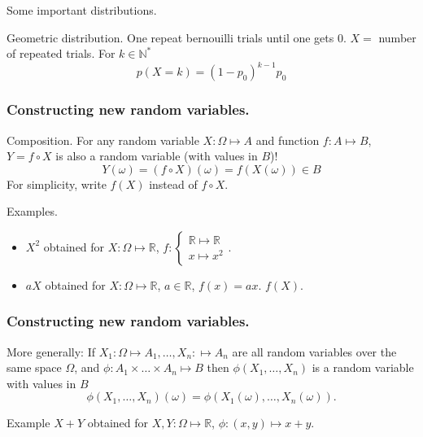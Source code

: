 \documentclass{beamer}
\begin{document}
\begin{frame}{Some important distributions.}
  \begin{exampleblock}{Geometric distribution.}
    One repeat bernouilli trials until one gets $0$. $X = $ number of repeated trials. For $k \in \mathbb{N}^*$
    \[p(X = k) = (1 - p_0)^{k-1}p_0\]
    
  \end{exampleblock}
\end{frame}

\begin{frame}
  \frametitle{Constructing new random variables.}
  \begin{block}{Composition.}
    For any random variable $X: \Omega \mapsto A$ and function $f: A \mapsto B$, $Y = f \circ X$ is also a random variable (with values in $B$)!
    \[Y(\omega) = (f \circ X) (\omega) = f(X(\omega)) \in B\]
    For simplicity, write $f(X)$ instead of $f \circ X$. 
  \end{block}
  \begin{exampleblock}{Examples.}
    \begin{itemize}
    \item $X^2$ obtained for $X: \Omega \mapsto \mathbb{R}$, $f: \left \{ \begin{array}{l} \mathbb{R} \mapsto \mathbb{R}\\ x \mapsto x^2 \end{array} \right .$.
    \item $aX$ obtained for $X: \Omega \mapsto \mathbb{R}$, $a \in \mathbb{R}$, $f(x) = a x$. $f(X)$.
    \end{itemize}
  \end{exampleblock}
\end{frame}

\begin{frame}
  \frametitle{Constructing new random variables.}
  \begin{block}{More generally:}
    If $X_1 : \Omega \mapsto A_1, \dots, X_n: \mapsto A_n$ are all random variables over the same space $\Omega$, and $\phi: A_1 \times \dots \times A_n \mapsto B$ then $\phi(X_1, \dots, X_n)$ is a random variable with values in $B$
    \[\phi(X_1, \dots, X_n)(\omega) = \phi(X_1(\omega), \dots, X_n(\omega)).\]
  \end{block}

  \begin{exampleblock}{Example}
     $X + Y$ obtained for $X, Y: \Omega \mapsto \mathbb{R}$, $\phi: (x,y) \mapsto x + y$.
  \end{exampleblock}
  
  
\end{frame}
\end{document}
